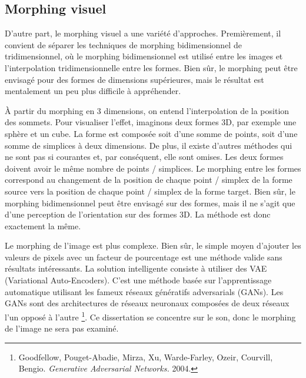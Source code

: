         
    \subsection{Morphing visuel}
    
D'autre part, le morphing visuel a une variété d'approches. Premièrement, il convient de séparer les techniques de morphing bidimensionnel de tridimensionnel, où le morphing bidimensionnel est utilisé entre les images et l’interpolation tridimensionnelle entre les formes. Bien sûr, le morphing peut être envisagé pour des formes de dimensions supérieures, mais le résultat est mentalement un peu plus difficile à appréhender.

À partir du morphing en 3 dimensions, on entend l'interpolation de la position des sommets. Pour visualiser l'effet, imaginons deux formes 3D, par exemple une sphère et un cube. La forme est composée soit d'une somme de points, soit d'une somme de simplices à deux dimensions. De plus, il existe d'autres méthodes qui ne sont pas si courantes et, par conséquent, elle sont omises. Les deux formes doivent avoir le même nombre de points / simplices. Le morphing entre les formes correspond au changement de la position de chaque point / simplex de la forme source vers la position de chaque point / simplex de la forme target. Bien sûr, le morphing bidimensionnel peut être envisagé sur des formes, mais il ne s'agit que d'une perception de l'orientation sur des formes 3D. La méthode est donc exactement la même.

Le morphing de l'image est plus complexe. Bien sûr, le simple moyen d’ajouter les valeurs de pixels avec un facteur de pourcentage est une méthode valide sans résultats intéressants. La solution intelligente consiste à utiliser des VAE (Variational Auto-Encoders). C'est une méthode basée sur l'apprentissage automatique utilisant les fameux réseaux génératifs adversarials (GANs). Les GANs sont des architectures de réseaux neuronaux composées de deux réseaux l’un opposé à l’autre \footnote{Goodfellow, Pouget-Abadie, Mirza, Xu, Warde-Farley, Ozeir, Courvill, Bengio. \textit{Generative Adversarial Networks.} 2004. \nocite{GANs}}. Ce dissertation se concentre sur le son, donc le morphing de l'image ne sera pas examiné.


   
